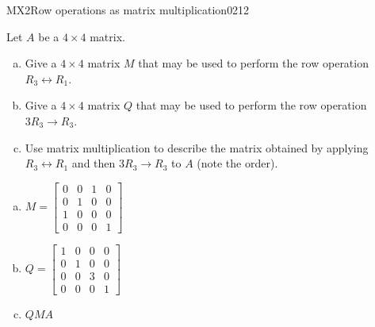 \begin{exercise}{MX2}{Row operations as matrix multiplication}{0212} 
\begin{exerciseStatement} 

Let \(A\) be a \(4 \times 4\) matrix.

 

\begin{enumerate}[(a)]
\item Give a \(4 \times 4\) matrix \(M\) that may be used to perform the row operation \(R_3 \leftrightarrow R_1\).
\item Give a \(4 \times 4\) matrix \(Q\) that may be used to perform the row operation \(3 R_3 \to R_3\).
\item Use matrix multiplication to describe the matrix obtained by applying \(R_3 \leftrightarrow R_1\) and then \(3 R_3 \to R_3\) to \(A\) (note the order). 
\end{enumerate}

     \end{exerciseStatement}
 \begin{exerciseAnswer} 

\begin{enumerate}[(a)]
\item \(M=\left[\begin{array}{cccc}
0 & 0 & 1 & 0 \\
0 & 1 & 0 & 0 \\
1 & 0 & 0 & 0 \\
0 & 0 & 0 & 1
\end{array}\right]\)
\item \(Q=\left[\begin{array}{cccc}
1 & 0 & 0 & 0 \\
0 & 1 & 0 & 0 \\
0 & 0 & 3 & 0 \\
0 & 0 & 0 & 1
\end{array}\right]\)
\item  \(QMA\) 
\end{enumerate}

     \end{exerciseAnswer}
 \end{exercise}


\newpage




